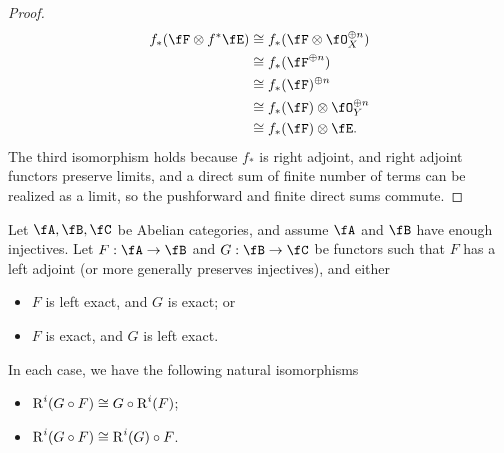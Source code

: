 \documentclass[a4paper]{article}
\begin{document}
\begin{enumerate} [label=\textbf{\arabic*.}, leftmargin=0em]
\begin{proof}
\begin{align*}
            f_*(\fF \otimes f^*\fE) & \cong f_*(\fF \otimes \fO_X^{\oplus n}) \\
                                    & \cong f_*(\fF^{\oplus n})               \\
                                    & \cong f_*(\fF)^{\oplus n}               \\
                                    & \cong f_*(\fF) \otimes \fO_Y^{\oplus n} \\
                                    & \cong f_*(\fF) \otimes \fE.
          \end{align*}
          The third isomorphism holds because $f_*$ is right adjoint, and right adjoint functors preserve limits, and a direct sum of finite number of terms can be realized as a limit, so the pushforward and finite direct sums commute.
        \end{proof}

        \begin{lemma}
          Let $\fA, \fB, \fC$ be Abelian categories, and assume $\fA$ and $\fB$ have enough injectives.
          Let $F : \fA \to \fB$ and $G : \fB \to \fC$ be functors such that $F$ has a left adjoint (or more generally preserves injectives), and either
          \begin{itemize}
            \item[(a)] $F$ is left exact, and $G$ is exact; or
            \item[(b)] $F$ is exact, and $G$ is left exact.
          \end{itemize}
          In each case, we have the following natural isomorphisms
          \begin{itemize}
            \item[(a)] $\operatorname{R}^i(G \circ F) \cong G \circ \operatorname{R}^i(F)$;
            \item[(b)] $\operatorname{R}^i(G \circ F) \cong \operatorname{R}^i(G) \circ F$.
          \end{itemize}
        \end{lemma}


\end{enumerate}
\end{document}
